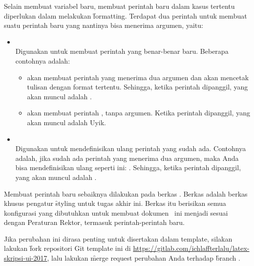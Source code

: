 Selain membuat variabel baru, membuat perintah baru dalam kasus tertentu diperlukan dalam melakukan \f{formatting}. Terdapat dua perintah untuk membuat suatu perintah baru yang nantinya bisa menerima argumen, yaitu:
\begin{itemize}
	\item {} \\
	Digunakan untuk membuat perintah yang benar-benar baru. Beberapa contohnya adalah:
	\begin{itemize}
		\item {} akan membuat perintah  yang menerima dua argumen dan akan mencetak tulisan dengan format tertentu. Sehingga, ketika perintah  dipanggil, yang akan muncul adalah .
		\item {} akan membuat perintah , tanpa argumen. Ketika perintah  dipanggil, yang akan muncul adalah Uyik.
	\end{itemize}
	\item {} \\
	Digunakan untuk mendefinisikan ulang perintah yang sudah ada. Contohnya adalah, jika sudah ada perintah  yang menerima dua argumen, maka Anda bisa mendefinisikan ulang seperti ini: . Sehingga, ketika perintah  dipanggil, yang akan muncul adalah .
\end{itemize}

Membuat perintah baru sebaiknya dilakukan pada berkas .
Berkas  adalah berkas khusus pengatur \f{styling} untuk tugas akhir ini.
Berkas itu berisikan semua konfigurasi yang dibutuhkan untuk membuat dokumen \latex~ini menjadi sesuai dengan Peraturan Rektor, termasuk perintah-perintah baru.

Jika perubahan ini dirasa penting untuk disertakan dalam template, silakan lakukan \f{fork} repositori Git template ini di \url{https://gitlab.com/ichlaffterlalu/latex-skripsi-ui-2017}, lalu lakukan \f{merge request} perubahan Anda terhadap \f{branch} .


